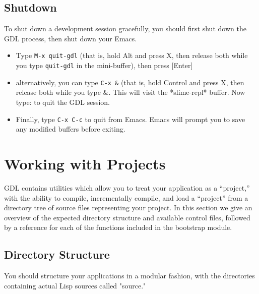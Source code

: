 \documentclass [11pt]{book}
\begin{document}
\subsection{Shutdown}

\label{subsec:shutdown}

 To shut down a development session gracefully, you should first shut down the GDL process,
then shut down your Emacs.

\begin{itemize}

\item Type \texttt{M-x quit-gdl} (that is, hold Alt and press X, then release both while you type \texttt{quit-gdl} in the mini-buffer), then press [Enter]

\item alternatively, you can type \texttt{C-x &} (that is, hold Control and press X, then release both while you type &. 
This will visit the *slime-repl* buffer. Now type: 
 to quit the GDL session.

\item Finally, type \texttt{C-x C-c} to quit from Emacs. Emacs will prompt you to save any
	   modified buffers before exiting.

\end{itemize}



\section{Working with Projects}

\label{sec:workingwithprojects}

GDL contains utilities which allow you to treat your
application as a ``project,'' with the ability to compile,
incrementally compile, and load a ``project'' from a directory tree of
source files representing your project. In this section we give an
overview of the expected directory structure and available control
files, followed by a reference for each of the functions included in
the bootstrap module.

\subsection{Directory Structure}

\label{subsec:directorystructure}



You should structure your applications in a modular fashion, with the
directories containing actual Lisp sources called "source."
\end{document}
